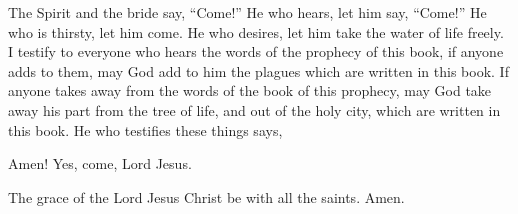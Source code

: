 {\par }{\PP {}The Spirit and the bride say, “Come!” He who hears, let him say, “Come!” He who is thirsty, let him come. He who desires, let him take the water of life freely.
I testify to everyone who hears the words of the prophecy of this book, if anyone adds to them, may God add to him the plagues which are written in this book.
If anyone takes away from the words of the book of this prophecy, may God take away his part from the tree of life, and out of the holy city, which are written in this book.
He who testifies these things says,
{}
\par }{\PP Amen! Yes, come, Lord Jesus.
\par }{\PP {}The grace of the Lord Jesus Christ be with all the saints. Amen.
\par }